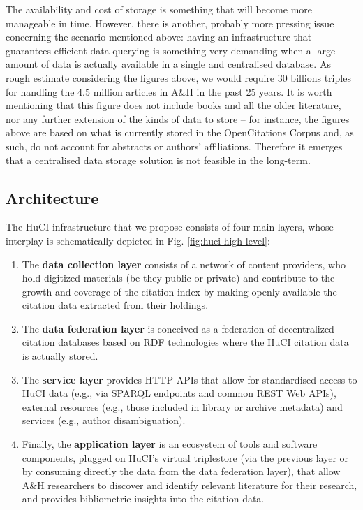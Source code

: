The availability and cost of storage is something that will become more manageable in time. However, there is another, probably more pressing issue concerning the scenario mentioned above: having an infrastructure that guarantees efficient data querying is something very demanding when a large amount of data is actually available in a single and centralised database. As rough estimate considering the figures above, we would require 30 billions triples for handling the 4.5 million articles in A\&H in the past 25 years. It is worth mentioning that this figure does not include books and all the older literature, nor any further extension of the kinds of data to store – for instance, the figures above are based on what is currently stored in the OpenCitations Corpus and, as such, do not account for abstracts or authors’ affiliations. Therefore it emerges that a centralised data storage solution is not feasible in the long-term.

\subsection{Architecture}

The HuCI infrastructure that we propose consists of four main layers, whose interplay is schematically depicted in Fig. \ref{fig:huci-high-level}:
\begin{enumerate}
    \item The \textbf{data collection layer} consists of a network of content providers, who hold digitized materials (be they public or private) and contribute to the growth and coverage of the citation index by making openly available the citation data extracted from their holdings.
    \item The \textbf{data federation layer} is conceived as a federation of decentralized citation databases based on RDF technologies where the HuCI citation data is actually stored.
    \item The \textbf{service layer} provides HTTP APIs that allow for standardised access to HuCI data (e.g., via SPARQL endpoints and common REST Web APIs), external resources (e.g., those included in library or archive metadata) and services (e.g., author disambiguation).
    \item Finally, the \textbf{application layer} is an ecosystem of tools and software components, plugged on HuCI's virtual triplestore (via the previous layer or by consuming directly the data from the data federation layer), that allow A\&H researchers to discover and identify relevant literature for their research, and provides bibliometric insights into the citation data.
\end{enumerate}

